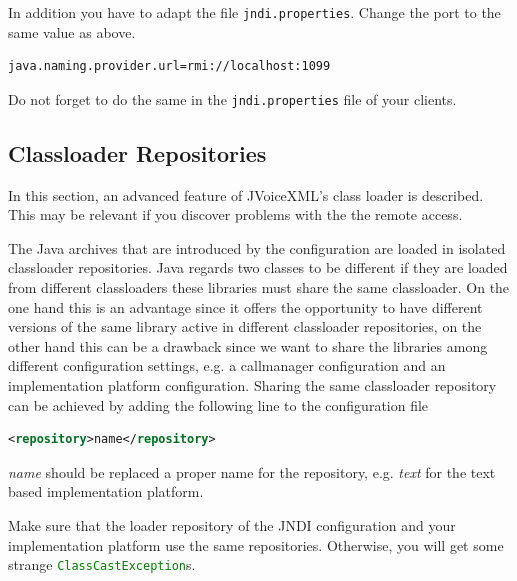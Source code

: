 \documentclass[11pt,a4paper]{book}
\begin{document}
In addition you have to adapt the file \texttt{jndi.properties}.
Change the port to the same value as above.

\begin{lstlisting}
java.naming.provider.url=rmi://localhost:1099
\end{lstlisting}

Do not forget to do the same in the \texttt{jndi.properties} file of your
clients.

\subsection{Classloader Repositories}

In this section, an advanced feature of JVoiceXML's class loader is described.
This may be relevant if you discover problems with the the remote access.

The Java archives that are introduced by the configuration are loaded
in isolated classloader repositories. Java regards two classes to be different if they are
loaded from different classloaders these libraries must share the same
classloader. On the one hand this is an advantage since it offers the opportunity
to have different versions of the same library active in different classloader
repositories, on the other hand this can be a drawback since we want to share the
libraries among different configuration settings, e.g. a callmanager
configuration and an implementation platform configuration. Sharing the same
classloader repository can be achieved by adding the following line to the
configuration file

\begin{lstlisting}[language=XML]
<repository>name</repository>
\end{lstlisting}

\emph{name} should be replaced a proper name for the repository, e.g.
\emph{text} for the text based implementation platform.

Make sure that the loader repository of the JNDI configuration and your
implementation platform use the same repositories. Otherwise, you will get some
strange \lstinline[language=Java]{ClassCastException}s.



\end{document}

